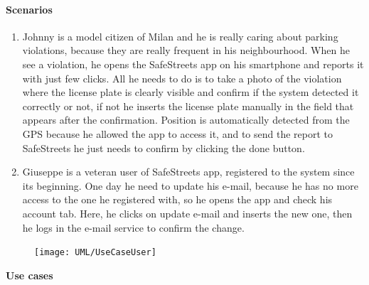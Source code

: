 \paragraph{Scenarios}
    \begin{enumerate}
        \item Johnny is a model citizen of Milan and he is really caring about parking violations, because they are really frequent in his neighbourhood. When he see a violation, he opens the SafeStreets app on his smartphone and reports it with just few clicks. All he needs to do is to take a photo of the violation where the license plate is clearly visible and confirm if the system detected it correctly or not, if not he inserts the license plate manually in the field that appears after the confirmation. Position is automatically detected from the GPS because he allowed the app to access it, and to send the report to SafeStreets he just needs to confirm by clicking the done button.
        
        \item Giuseppe is a veteran user of SafeStreets app, registered to the system since its beginning. One day he need to update his e-mail, because he has no more access to the one he registered with, so he opens the app and check his account tab. Here, he clicks on update e-mail and inserts the new one, then he logs in the e-mail service to confirm the change.
    \end{enumerate}

\begin{figure}[H]
	\centering
    \texttt{[image: UML/UseCaseUser]}
\end{figure}	

\textbf{Use cases}\\


